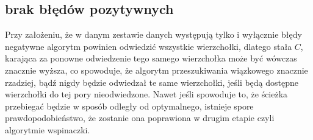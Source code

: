 \documentclass{article}
\begin{document}
\subsection{brak błędów pozytywnych}
Przy założeniu, że w danym zestawie danych występują tylko i wyłącznie błędy negatywne algorytm powinien odwiedzić wszystkie wierzchołki, dlatego stała $C$, karająca za ponowne odwiedzenie tego samego wierzchołka może być wówczas znacznie wyższa, co spowoduje, że algorytm przeszukiwania wiązkowego znacznie rzadziej, bądź nigdy będzie odwiedzał te same wierzchołki, jeśli będą dostępne wierzchołki do tej pory nieodwiedzone. Nawet jeśli spowoduje to, że ścieżka przebiegać będzie w sposób odległy od optymalnego, istnieje spore prawdopodobieństwo, że zostanie ona poprawiona w drugim etapie czyli algorytmie wspinaczki.
\end{document}
